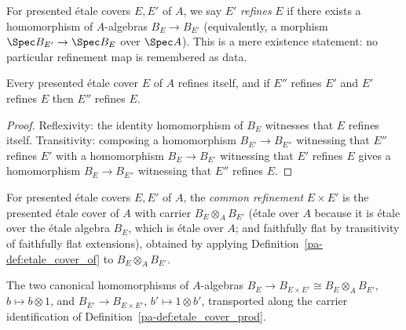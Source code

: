 \begin{definition}[Refinement]
  \label{pa-def:etale_cover_refines}
  \leanok

  For presented \'etale covers \(E, E'\) of \(A\), we say \(E'\) \emph{refines} \(E\) if there
  exists a homomorphism of \(A\)-algebras \(B_E \to B_{E'}\) (equivalently, a morphism
  \(\Spec B_{E'} \to \Spec B_E\) over \(\Spec A\)). This is a mere existence statement: no
  particular refinement map is remembered as data.
\end{definition}

\begin{lemma}
  \label{pa-lem:etale_cover_refines_preorder}
  \leanok

  Every presented \'etale cover \(E\) of \(A\) refines itself, and if \(E''\) refines \(E'\)
  and \(E'\) refines \(E\) then \(E''\) refines \(E\).
\end{lemma}
\begin{proof}
  \leanok
  Reflexivity: the identity homomorphism of \(B_E\) witnesses that \(E\) refines itself.
  Transitivity: composing a homomorphism \(B_{E'} \to B_{E''}\) witnessing that \(E''\) refines
  \(E'\) with a homomorphism \(B_E \to B_{E'}\) witnessing that \(E'\) refines \(E\) gives a
  homomorphism \(B_E \to B_{E''}\) witnessing that \(E''\) refines \(E\).
\end{proof}

\begin{definition}
  \label{pa-def:etale_cover_prod}
  \leanok

  For presented \'etale covers \(E, E'\) of \(A\), the \emph{common refinement} \(E \times E'\)
  is the presented \'etale cover of \(A\) with carrier \(B_E \otimes_A B_{E'}\) (\'etale over
  \(A\) because it is \'etale over the \'etale algebra \(B_E\), which is \'etale over \(A\); and
  faithfully flat by transitivity of faithfully flat extensions), obtained by applying
  Definition~\ref{pa-def:etale_cover_of} to \(B_E \otimes_A B_{E'}\).
\end{definition}

\begin{definition}
  \label{pa-def:etale_cover_prod_coproj}
  \leanok

  The two canonical homomorphisms of \(A\)-algebras
  \(B_E \to B_{E \times E'} \cong B_E \otimes_A B_{E'}\), \(b \mapsto b \otimes 1\), and
  \(B_{E'} \to B_{E \times E'}\), \(b' \mapsto 1 \otimes b'\), transported along the carrier
  identification of Definition~\ref{pa-def:etale_cover_prod}.
\end{definition}


